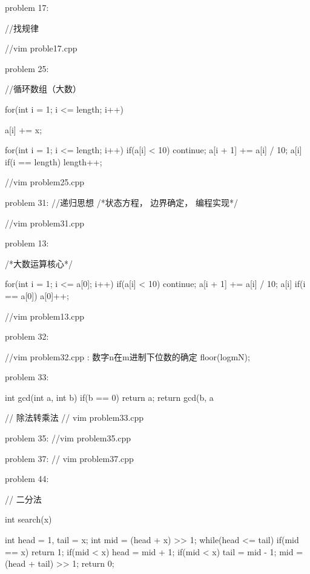 problem 17:

 //找规律
 
 //vim proble17.cpp
 
 
 
 problem 25:
 
 //循环数组（大数）
 
 for(int i = 1; i <= length; i++)
 {
 
 	a[i] += x;
 }
 
 for(int i = 1; i <= length; i++)
 {
 	if(a[i] < 10)
 	{
 		continue;
 	}
 	a[i + 1] += a[i] / 10;
 	a[i] %
 	if(i == length)
 	length++;
 }
  
 //vim problem25.cpp
 
 
 
 problem 31:
 //递归思想
 /*状态方程， 边界确定， 编程实现*/
 
 //vim problem31.cpp
 
 
 
 
 problem 13:
 
 
 /*大数运算核心*/
 
 for(int i = 1; i <= a[0]; i++)
 {
 	if(a[i] < 10)
 	continue;
 	a[i + 1] += a[i] / 10;
 	a[i] %
 	if(i == a[0])
 	a[0]++;
 }
 
 //vim problem13.cpp
 
 
 
 problem 32:
 
 


 //vim problem32.cpp  :  数字n在m进制下位数的确定 floor(logmN);
 
 


problem 33:



int gcd(int a, int b)
{
	if(b == 0)
	return a;
	return gcd(b, a %
}

//  除法转乘法  
// vim problem33.cpp




problem 35:
 //vim problem35.cpp
 
 
 
 problem 37:
 // vim problem37.cpp
 
 
 
 
 
 problem 44:
 
 // 二分法
 
 int search(x)
 {
 
    int head = 1, tail = x;
    int mid = (head + x) >> 1;
    while(head <= tail)
    {
        if(mid == x)
        return 1;
        if(mid < x)
        head = mid + 1;
        if(mid < x)
        tail = mid - 1;
        mid = (head + tail) >> 1;
    }
    return 0;
 
 }
 
 
 
 
